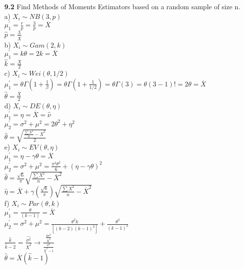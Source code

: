 
{\bf 9.2} Find Methods of Moments Estimators based on a random sample of size n. \\

a) ${ X }_{ i }\sim NB(3,p)$\\
${ \mu  }_{ 1 }^{ ' }= \frac{r}{p} = \frac{3}{p} = \overline { X } $\\
$\hat { p } = \frac{3}{\overline { X }}$\\


b) ${ X }_{ i }\sim Gam(2,k)$\\
${ \mu  }_{ 1 }^{ ' }= k\theta = 2k = \overline { X } $\\
$\hat { k } = \frac{\overline { X }}{2}$\\


c) ${ X }_{ i }\sim Wei(\theta,1/2)$\\
${ \mu  }_{ 1 }^{ ' }= \theta \Gamma (1+\frac { 1 }{ \beta  } ) = \theta \Gamma (1+\frac { 1 }{ 1/2  } ) = \theta \Gamma (3) = \theta(3-1)! = 2\theta = \overline{X}  $\\
$\hat { \theta } = \frac{\overline { X }}{2}$\\


d) ${ X }_{ i }\sim DE(\theta,\eta)$\\
${ \mu  }_{ 1 }^{ ' }= \eta = \overline{X} = \hat{\nu} $\\
${ \mu  }_{ 2 }^{ ' }= \sigma^{2}+\mu^{2} = 2\theta^{2}+\eta^{2}$\\
$ \hat{\theta}= \sqrt{\frac{\frac{\sum X^{2}}{n}-\overline{X}^{2}}{2}}$\\


e) ${ X }_{ i }\sim EV(\theta,\eta)$\\
${ \mu  }_{ 1 }^{ ' }= \eta - \gamma \theta = \overline{X}  $\\
${ \mu  }_{ 2 }^{ ' }= \sigma^{2}+\mu^{2} = \frac{\pi^{2}\theta^{2}}{6} + (\eta - \gamma \theta)^{2}$\\
$ \hat{\theta}= \frac{\sqrt{6}}{\pi}\sqrt{\frac{\sum X^{2}}{n} - \overline{X}^{2}}$\\
$ \hat{\eta}= \overline{X}+\gamma(\frac{\sqrt{6}}{\pi})\sqrt{\frac{\sum X^{2}}{n} - \overline{X}^{2}}$\\


f) ${ X }_{ i }\sim Par(\theta,k)$\\
${ \mu  }_{ 1 }^{ ' }= \frac{\theta}{(k-1)} = \overline{X}$\\
${ \mu  }_{ 2 }^{ ' }= \sigma^{2}+\mu^{2} = \frac{\theta^{2}k}{[(k-2)(k-1)^{2}]}+\frac{\theta^{2}}{(k-1)^{2}}$\\
$ \frac{\hat{k}}{\hat{k}-2}=\frac{\hat{\sigma^{2}}}{\overline{X}^{2}} \rightarrow \frac{\frac{2\sigma^{2}}{\overline{X}^{2}}}{\frac{\sigma^{2}}{\overline{X}^{2}-1}}$\\
$ \hat{\theta}=\overline{X}(\hat{k}-1)$\\
